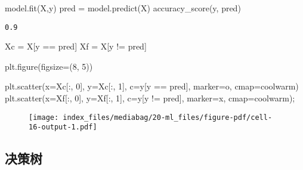 \documentclass[
  letterpaper,
  DIV=11,
  numbers=noendperiod]{scrreprt}
\newenvironment{Shaded}{\begin{snugshade}}{\end{snugshade}}
\newcommand{\DecValTok}[1]{\textcolor[rgb]{0.68,0.00,0.00}{#1}}
\newcommand{\NormalTok}[1]{\textcolor[rgb]{0.00,0.23,0.31}{#1}}
\newcommand{\OperatorTok}[1]{\textcolor[rgb]{0.37,0.37,0.37}{#1}}
\newcommand{\StringTok}[1]{\textcolor[rgb]{0.13,0.47,0.30}{#1}}
\begin{document}
\begin{Shaded}
\begin{Highlighting}[]
\NormalTok{model.fit(X,y)}
\NormalTok{pred }\OperatorTok{=}\NormalTok{ model.predict(X) }
\NormalTok{accuracy\_score(y, pred) }
\end{Highlighting}
\end{Shaded}

\begin{verbatim}
0.9
\end{verbatim}

\begin{Shaded}
\begin{Highlighting}[]
\NormalTok{Xc }\OperatorTok{=}\NormalTok{ X[y }\OperatorTok{==}\NormalTok{ pred]}
\NormalTok{Xf }\OperatorTok{=}\NormalTok{ X[y }\OperatorTok{!=}\NormalTok{ pred]}

\NormalTok{plt.figure(figsize}\OperatorTok{=}\NormalTok{(}\DecValTok{8}\NormalTok{, }\DecValTok{5}\NormalTok{))}

\NormalTok{plt.scatter(x}\OperatorTok{=}\NormalTok{Xc[:, }\DecValTok{0}\NormalTok{], y}\OperatorTok{=}\NormalTok{Xc[:, }\DecValTok{1}\NormalTok{], c}\OperatorTok{=}\NormalTok{y[y }\OperatorTok{==}\NormalTok{ pred],}
\NormalTok{            marker}\OperatorTok{=}\StringTok{\textquotesingle{}o\textquotesingle{}}\NormalTok{, cmap}\OperatorTok{=}\StringTok{\textquotesingle{}coolwarm\textquotesingle{}}\NormalTok{)}
\NormalTok{plt.scatter(x}\OperatorTok{=}\NormalTok{Xf[:, }\DecValTok{0}\NormalTok{], y}\OperatorTok{=}\NormalTok{Xf[:, }\DecValTok{1}\NormalTok{], c}\OperatorTok{=}\NormalTok{y[y }\OperatorTok{!=}\NormalTok{ pred],}
\NormalTok{            marker}\OperatorTok{=}\StringTok{\textquotesingle{}x\textquotesingle{}}\NormalTok{, cmap}\OperatorTok{=}\StringTok{\textquotesingle{}coolwarm\textquotesingle{}}\NormalTok{)}\OperatorTok{;}
\end{Highlighting}
\end{Shaded}

\begin{figure}[H]

{\centering \texttt{[image: index\_files/mediabag/20-ml\_files/figure-pdf/cell-16-output-1.pdf]}

}

\end{figure}

\hypertarget{ux51b3ux7b56ux6811}{%
\subsection{决策树}\label{ux51b3ux7b56ux6811}}
\end{document}
